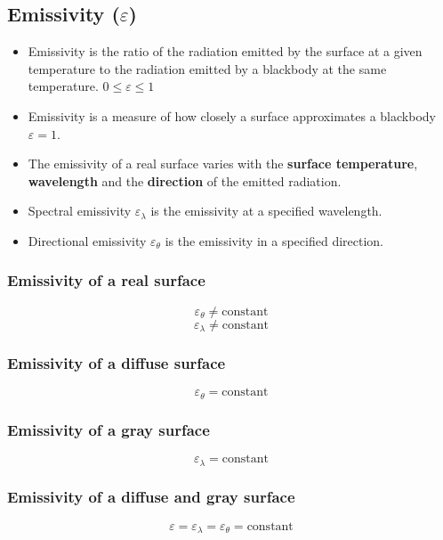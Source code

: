 \documentclass[11pt]{article}
\begin{document}
\subsection{Emissivity (\(\varepsilon\))}
\label{sec:orgc770690}
\begin{itemize}
\item Emissivity is the ratio of the radiation emitted by the surface at a given temperature to the radiation emitted by a blackbody at the same temperature. \(0 \le \varepsilon \le 1\)
\item Emissivity is a measure of how closely a surface approximates a blackbody \(\varepsilon = 1\).
\item The emissivity of a real surface varies with the \textbf{surface temperature}, \textbf{wavelength} and the \textbf{direction} of the emitted radiation.
\item Spectral emissivity \(\varepsilon_{\lambda}\) is the emissivity at a specified wavelength.
\item Directional emissivity \(\varepsilon_{\theta}\) is the emissivity in a specified direction.
\end{itemize}

\subsubsection{Emissivity of a real surface}
\label{sec:org8c73aa4}
\[\varepsilon_{\theta} \ne \text{constant}\]
\[\varepsilon_{\lambda} \ne \text{constant}\]

\subsubsection{Emissivity of a diffuse surface}
\label{sec:org2d29006}
\[\varepsilon_{\theta} = \text{constant}\]

\subsubsection{Emissivity of a gray surface}
\label{sec:org0bb8e21}
\[\varepsilon_{\lambda} = \text{constant}\]

\subsubsection{Emissivity of a diffuse and gray surface}
\label{sec:org198e56b}
\[\varepsilon = \varepsilon_{\lambda} = \varepsilon_{\theta} = \text{constant}\]
\end{document}
